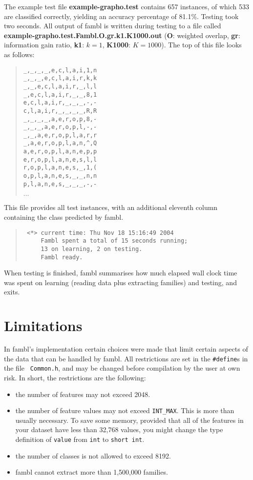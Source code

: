 \documentclass[11pt]{article}
\begin{document}
The example test file {\bf example-grapho.test} contains 657
instances, of which 533 are classified correctly, yielding an accuracy
percentage of 81.1\%. Testing took two seconds. All output of
{\sc fambl} is written during testing to a file called {\bf
  example-grapho.test.Fambl.O.gr.k1.K1000.out} ({\bf O}: weighted
overlap, {\bf gr}: information gain ratio, {\bf k1}: $k=1$, {\bf
  K1000}: $K=1000$). The top of this file looks as follows:

\begin{quote}
{\tiny
\begin{verbatim}
_,_,_,_,e,c,l,a,i,1,n
_,_,_,e,c,l,a,i,r,k,k
_,_,e,c,l,a,i,r,_,l,l
_,e,c,l,a,i,r,_,_,8,1
e,c,l,a,i,r,_,_,_,-,-
c,l,a,i,r,_,_,_,_,R,R
_,_,_,_,a,e,r,o,p,8,-
_,_,_,a,e,r,o,p,l,-,-
_,_,a,e,r,o,p,l,a,r,r
_,a,e,r,o,p,l,a,n,^,Q
a,e,r,o,p,l,a,n,e,p,p
e,r,o,p,l,a,n,e,s,l,l
r,o,p,l,a,n,e,s,_,1,(
o,p,l,a,n,e,s,_,_,n,n
p,l,a,n,e,s,_,_,_,-,-
\end{verbatim}
$\ldots$
}
\end{quote}

This file provides all test instances, with an additional eleventh
column containing the class predicted by {\sc fambl}.

\begin{quote}
{\tiny
\begin{verbatim}
 <*> current time: Thu Nov 18 15:16:49 2004
     Fambl spent a total of 15 seconds running;
     13 on learning, 2 on testing.
     Fambl ready.
\end{verbatim}
}
\end{quote}

When testing is finished, {\sc fambl} summarises how much elapsed wall
clock time was spent on learning (reading data plus extracting
families) and testing, and exits.

\section{Limitations}
\label{notes}

In {\sc fambl}'s implementation certain choices were made that limit
certain aspects of the data that can be handled by {\sc fambl}. All
restrictions are set in the {\tt \#define}s in the file {\tt
Common.h}, and may be changed before compilation by the user at own
risk. In short, the restrictions are the following:

\begin{itemize}
\item
the number of features may not exceed 2048.
\item
the number of feature values may not exceed {\tt INT\_MAX}. This is
more than usually necessary. To save some memory, provided that all of
the features in your dataset have less than 32,768 values, you might
change the type definition of {\tt value} from {\tt int} to {\tt short
  int}.
\item
the number of classes is not allowed to exceed 8192.
\item
{\sc fambl} cannot extract more than 1,500,000 families.
\end{itemize}
\end{document}
